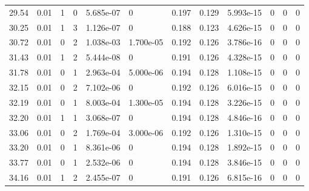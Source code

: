 \documentclass[preview]{standalone}
\begin{document}
{{{\begin{tabular}{L{1.2cm}C{1.2cm} C{0.3cm}C{0.5cm} C{1.4cm}C{1.4cm} C{1.4cm}C{1.4cm} C{1.6cm}C{1.6cm} C{1.6cm}C{1.6cm}}
  29.54  &  0.01  & 1     &  0 &  5.685e-07  & 0  &  0.197&   0.129& 5.993e-15 & 0   &  0 & 0  \\ 
  30.25  &  0.01  & 1     &  3 &  1.126e-07  & 0  &  0.188&   0.123& 4.626e-15 & 0   &  0 & 0  \\ 
  30.72  &  0.01  & 0     &  2 &  1.038e-03  & 1.700e-05  &  0.192&   0.126& 3.786e-16 & 0   &  0 & 0  \\ 
  31.43  &  0.01  & 1     &  2 &  5.444e-08  & 0  &  0.191&   0.126& 4.328e-15 & 0   &  0 & 0  \\ 
  31.78  &  0.01  & 0     &  1 &  2.963e-04  & 5.000e-06  &  0.194&   0.128& 1.108e-15 & 0   &  0 & 0  \\ 
  32.15  &  0.01  & 0     &  2 &  7.102e-06  & 0  &  0.192&   0.126& 6.016e-15 & 0   &  0 & 0  \\ 
  32.19  &  0.01  & 0     &  1 &  8.003e-04  & 1.300e-05  &  0.194&   0.128& 3.226e-15 & 0   &  0 & 0  \\ 
  32.20  &  0.01  & 1     &  1 &  3.068e-07  & 0  &  0.194&   0.128& 4.846e-16 & 0   &  0 & 0  \\ 
  33.06  &  0.01  & 0     &  2 &  1.769e-04  & 3.000e-06  &  0.192&   0.126& 1.310e-15 & 0   &  0 & 0  \\ 
  33.20  &  0.01  & 0     &  1 &  8.361e-06  & 0  &  0.194&   0.128& 1.892e-15 & 0   &  0 & 0  \\ 
  33.77  &  0.01  & 0     &  1 &  2.532e-06  & 0  &  0.194&   0.128& 3.846e-15 & 0   &  0 & 0  \\ 
  34.16  &  0.01  & 1     &  2 &  2.455e-07  & 0  &  0.191&   0.126& 6.815e-16 & 0   &  0 & 0  \\ 
\hline 
\end{tabular} 

}}}
\end{document}
